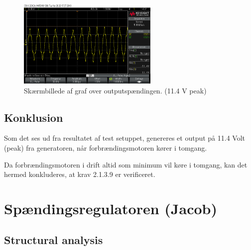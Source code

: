 \begin{figure}[h]
  \centering
  \includegraphics[width=0.6\textwidth]{scope0.png}
  \caption{Skærmbillede af graf over outputspændingen. (11.4 V peak)}
  \label{fig:scope1}
\end{figure}




\subsection{Konklusion}
\label{sec:konklusion}

Som det ses ud fra resultatet af test setuppet, genereres et output på 11.4 Volt (peak) fra generatoren, når forbrændingsmotoren kører i tomgang. 

Da forbrændingsmotoren i drift altid som minimum vil køre i tomgang, kan det hermed konkluderes, at krav 2.1.3.9 er verificeret. 
\clearpage
\section{Spændingsregulatoren (Jacob)}
\label{sec:spandingsregulatoren}

\subsection{Structural analysis}
\label{sec:structural-analysis}

